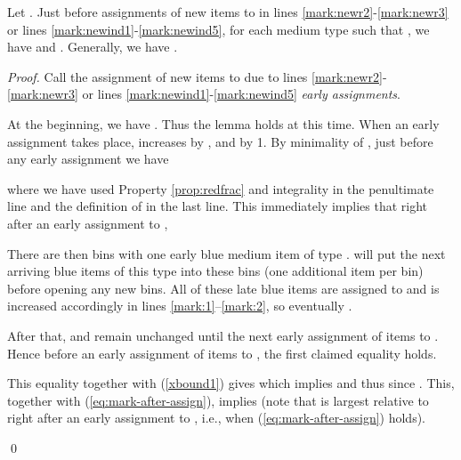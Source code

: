 \begin{lemma}
\label{lem:marksNR}
Let .
Just before assignments of new items to  in lines \ref{mark:newr2}-\ref{mark:newr3} or lines \ref{mark:newind1}-\ref{mark:newind5},
for each medium type  such that ,
we have 
and . Generally, we have 
 . 
\end{lemma}
\begin{proof}
Call the assignment of new items to  due to lines \ref{mark:newr2}-\ref{mark:newr3} or lines \ref{mark:newind1}-\ref{mark:newind5} \emph{early assignments}. 


At the beginning, we have .
Thus the lemma holds at this time.
When an early assignment takes place, 
 increases by , and  by 1.
By minimality of , just before any early assignment we have

where we have used Property \ref{prop:redfrac} and integrality in the penultimate line and
the definition of  in the last line.
This immediately implies that right after an early assignment to ,

There are then  bins with one early blue medium item of type . 
{\EHarm} will put
the next arriving blue items of this type into these  bins (one additional item per bin) before opening any new bins.
All of these late blue items are assigned to  and  is increased accordingly in lines \ref{mark:1}--\ref{mark:2},
so eventually .

After that,  and  remain unchanged until the next early assignment of items to . Hence before an early assignment of items to , the first claimed equality holds.

This equality together with (\ref{xbound1}) 
gives 
which implies  and thus  since .
This, together with (\ref{eq:mark-after-assign}), implies  (note that  is largest relative to  right after an early assignment to , i.e., when (\ref{eq:mark-after-assign}) holds).
\iffalse
It furthermore follows from (\ref{xbound2}) that after any early assignment
has taken place and the  bins with one blue item have received their
second blue item, we have 

since by this time  has increased by  and
 has increased by 1 compared to the situation in (\ref{xbound2}).
This also holds before the first early assignment takes place.
By definition of , we have . This, together with (\ref{lem1:before-assignment}), implies
 and thus .
\fi 
\qed\end{proof}

\iffalse 
\begin{corollary}
	\label{cor}
	For a medium type  with , let 
	Then  in all iterations of Algorithm \ref{alg:mark} for type .
\end{corollary}
\begin{proof}
	By Lemma \ref{lem:marksNR},  is strictly contained in an open interval of length 2.
\end{proof}
\fi 

